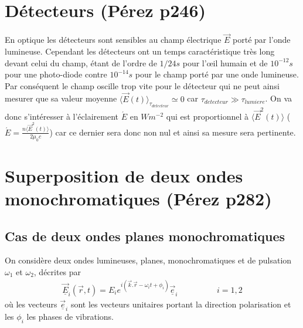 \documentclass[12pt,prb,aps,epsf]{report}
\begin{document}
\section{Détecteurs (Pérez p246)}
En optique les détecteurs sont sensibles au champ électrique $\vec{E}$ porté par l'onde lumineuse. Cependant les détecteurs ont un temps caractéristique très long devant celui du champ, étant de l'ordre de $1/24s$ pour l'œil humain et de $10^{-12}s$ pour une photo-diode contre $10^{-14}s$ pour le champ porté par une onde lumineuse. Par conséquent le champ oscille trop vite pour le détecteur qui ne peut ainsi mesurer que sa valeur moyenne $\langle\vec{E}(t)\rangle_{\tau_{detecteur}} \simeq 0$ car $\tau_{detecteur} \gg \tau_{lumiere}$. On va donc s'intéresser à l'éclairement $\acute{E}$ en $Wm^{-2}$ qui est proportionnel à $\langle\vec{E}^2(t)\rangle$ ($\acute{E}= \frac{n\langle\vec{E}^2(t) \rangle}{2\mu_0c}$) car ce dernier sera donc non nul et ainsi sa mesure sera pertinente.

\section{Superposition de deux ondes monochromatiques (Pérez p282)}
\subsection{Cas de deux ondes planes monochromatiques}
On considère deux ondes lumineuses, planes, monochromatiques et de pulsation $\omega_1$ et $\omega_2$, décrites par 
\begin{eqnarray}
\underline{\vec{E}}_i(\vec{r}, t) = E_i e^{i(\vec{k}.\vec{r} - \omega_it+\phi_i)}\vec{\underline{e}}_i \hspace{2cm} i=1,2
\end{eqnarray}
où les vecteurs $\vec{\underline{e}}_i$ sont les vecteurs unitaires portant la direction polarisation et les $\phi_i$ les phases de vibrations.
\end{document}

